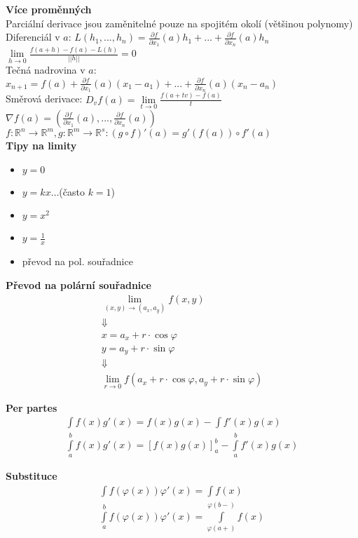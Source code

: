 \documentclass[8pt, a4paper]{extarticle}
\newcommand{\reals}{\mathbb{R}}
\begin{document}
\begin{multicols}{3}
 
\textbf{Více proměnných}\\
Parciální derivace jsou zaměnitelné pouze na spojitém okolí (většinou polynomy)\\
Diferenciál v $a$: $L(h_1,...,h_n)=\frac{\partial f}{\partial x_1}(a)h_1+...+\frac{\partial f}{\partial x_n}(a)h_n$\\
$\lim\limits_{h\to 0}\frac{f(a+h)-f(a)-L(h)}{||h||}=0$\\
Tečná nadrovina v $a$: $x_{n+1}=f(a)+\frac{\partial f}{\partial x_1}(a)(x_1-a_1)+...+\frac{\partial f}{\partial x_n}(a)(x_n-a_n)$\\
Směrová derivace: $D_vf(a)=\lim\limits_{t\to 0}\frac{f(a+tv)-f(a)}{t}$\\
$\nabla f(a)=\left(\frac{\partial f}{\partial x_1}(a), ..., \frac{\partial f}{\partial x_n}(a)\right)$ \\
$f: \reals^n\to\reals^m, g: \reals^m\to\reals^s: (g\circ f)'(a)=g'(f(a))\circ f'(a)$\\
\textbf{Tipy na limity}
\begin{itemize}
\item $y = 0$
\item $y = kx \ldots$(často $k=1$)
\item $y = x^2$
\item $y = \frac{1}{x}$
\item převod na pol. souřadnice
\end{itemize}
 
\textbf{Převod na polární souřadnice}
\begin{align*}
\lim\limits_{(x,y) \rightarrow (a_x, a_y)} f(x,y)\\
\Downarrow \\
x = a_x + r \cdot \cos{\varphi}\\
y = a_y + r \cdot \sin{\varphi}\\
\Downarrow \\
\lim\limits_{r \rightarrow 0} f(a_x + r \cdot \cos{\varphi}, a_y + r \cdot \sin{\varphi})
\end{align*}
 
\textbf{Per partes}
\begin{align*}
\int f(x)g'(x) = f(x)g(x) - \int f'(x)g(x)\\
\int\limits_{a}^{b} f(x)g'(x) = [f(x)g(x)]_{a}^b- \int\limits_{a}^{b} f'(x)g(x)
\end{align*}
 
\textbf{Substituce}
\begin{align*}
\int f(\varphi(x))\varphi'(x) = \int f(x)\\
\int\limits_{a}^{b} f(\varphi(x))\varphi'(x) = \int\limits_{\varphi(a+)}^{\varphi(b-)} f(x)\\
\end{align*}
 

\end{multicols}
\end{document}
